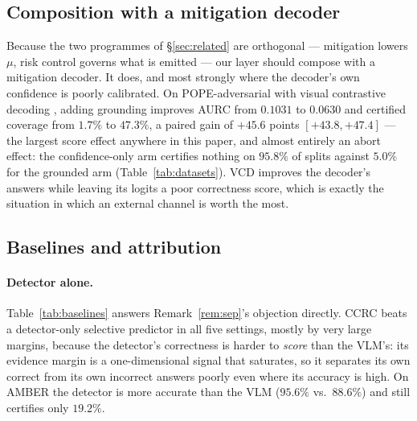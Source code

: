 \documentclass{article}
\theoremstyle{plain}
\theoremstyle{definition}
\theoremstyle{remark}
\begin{document}
\subsection{Composition with a mitigation decoder}
\label{sec:vcd}

Because the two programmes of \S\ref{sec:related} are orthogonal --- mitigation lowers
$\mu$, risk control governs what is emitted --- our layer should compose with a mitigation
decoder. It does, and most strongly where the decoder's own confidence is poorly calibrated. On
POPE-adversarial with visual contrastive decoding \citep{vcd}, adding grounding improves AURC
from $0.1031$ to $0.0630$ and certified coverage from $1.7\%$ to $47.3\%$, a paired gain of
$+45.6$ points $[+43.8,+47.4]$ --- the largest score effect anywhere in this paper, and almost
entirely an abort effect: the confidence-only arm certifies nothing on $95.8\%$ of splits against
$5.0\%$ for the grounded arm (Table~\ref{tab:datasets}). VCD improves the decoder's answers
while leaving its logits a poor correctness score, which is exactly the situation in which an
external channel is worth the most.

\subsection{Baselines and attribution}
\label{sec:attribution}

\paragraph{Detector alone.}
Table~\ref{tab:baselines} answers Remark~\ref{rem:sep}'s objection directly. CCRC beats a
detector-only selective predictor in all five settings, mostly by very large margins, because
the detector's correctness is harder to \emph{score} than the VLM's: its evidence margin is a
one-dimensional signal that saturates, so it separates its own correct from its own incorrect
answers poorly even where its accuracy is high. On AMBER the detector is more accurate than the
VLM ($95.6\%$ vs.\ $88.6\%$) and still certifies only $19.2\%$.
\end{document}
